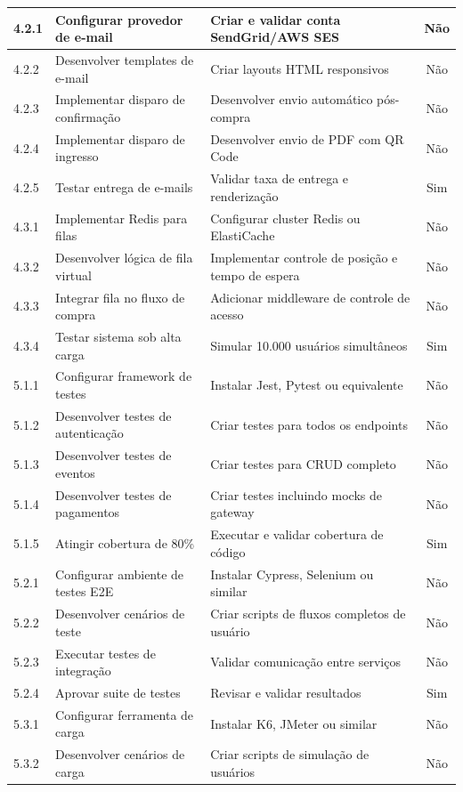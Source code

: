 \begin{table}[H]
\begin{tabular}{|p{0.9cm}|p{6.2cm}|p{5.7cm}|c|}
4.2.1 & Configurar provedor de e-mail & Criar e validar conta SendGrid/AWS SES & Não \\ \hline
4.2.2 & Desenvolver templates de e-mail & Criar layouts HTML responsivos & Não \\ \hline
4.2.3 & Implementar disparo de confirmação & Desenvolver envio automático pós-compra & Não \\ \hline
4.2.4 & Implementar disparo de ingresso & Desenvolver envio de PDF com QR Code & Não \\ \hline
4.2.5 & Testar entrega de e-mails & Validar taxa de entrega e renderização & Sim \\ \hline
4.3.1 & Implementar Redis para filas & Configurar cluster Redis ou ElastiCache & Não \\ \hline
4.3.2 & Desenvolver lógica de fila virtual & Implementar controle de posição e tempo de espera & Não \\ \hline
4.3.3 & Integrar fila no fluxo de compra & Adicionar middleware de controle de acesso & Não \\ \hline
4.3.4 & Testar sistema sob alta carga & Simular 10.000 usuários simultâneos & Sim \\ \hline
5.1.1 & Configurar framework de testes & Instalar Jest, Pytest ou equivalente & Não \\ \hline
5.1.2 & Desenvolver testes de autenticação & Criar testes para todos os endpoints & Não \\ \hline
5.1.3 & Desenvolver testes de eventos & Criar testes para CRUD completo & Não \\ \hline
5.1.4 & Desenvolver testes de pagamentos & Criar testes incluindo mocks de gateway & Não \\ \hline
5.1.5 & Atingir cobertura de 80\% & Executar e validar cobertura de código & Sim \\ \hline
5.2.1 & Configurar ambiente de testes E2E & Instalar Cypress, Selenium ou similar & Não \\ \hline
5.2.2 & Desenvolver cenários de teste & Criar scripts de fluxos completos de usuário & Não \\ \hline
5.2.3 & Executar testes de integração & Validar comunicação entre serviços & Não \\ \hline
5.2.4 & Aprovar suite de testes & Revisar e validar resultados & Sim \\ \hline
5.3.1 & Configurar ferramenta de carga & Instalar K6, JMeter ou similar & Não \\ \hline
5.3.2 & Desenvolver cenários de carga & Criar scripts de simulação de usuários & Não \\ \hline

\end{tabular}
\end{table}
